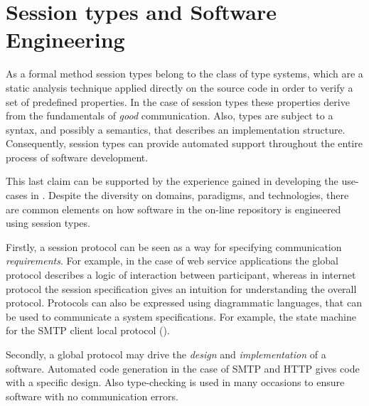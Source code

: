 \section{Session types and Software Engineering}
\label{sec:session_engineeering}




As a formal method session types belong to the class of type systems,
which are a static analysis technique applied directly
on the source code in order to verify a set of predefined properties.
In the case of session types these properties derive
from the fundamentals of {\em good} communication.
Also, types are subject to a syntax,
and possibly a semantics, that describes an implementation structure.
Consequently, session types can provide automated support throughout
the entire process of software development. 

This last claim can be supported by the experience gained
in developing the use-cases in .
Despite the diversity on domains, paradigms, and technologies,
there are common elements on how software in the on-line repository
is engineered using session types.

Firstly, a session protocol can be seen as a way for specifying
communication {\em requirements}. For example, in the case of web service applications
the global protocol describes a logic of interaction between participant,
whereas in internet protocol the session specification gives
an intuition for understanding the overall protocol. 
Protocols can also be expressed using diagrammatic languages,
that can be used to communicate a system specifications.
For example, the state machine for the SMTP client local protocol ().

Secondly, a global protocol may drive the {\em design} and
{\em implementation} of a software.
Automated code generation in the case of SMTP and HTTP
gives code with a specific design.
Also type-checking is used in many occasions to ensure
software with no communication errors.

